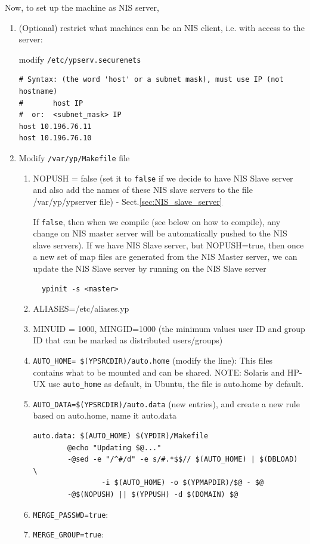 Now, to set up the machine as NIS server, 
\begin{enumerate}
   \item (Optional) restrict what machines can be an NIS client, i.e. with
   access to the server: 
   
modify \verb!/etc/ypserv.securenets!
{\tiny
\begin{verbatim}
# Syntax: (the word 'host' or a subnet mask), must use IP (not hostname) 
#       host IP
#  or:  <subnet_mask> IP
host 10.196.76.11
host 10.196.76.10
\end{verbatim}
}

   \item Modify \verb!/var/yp/Makefile! file 

\begin{enumerate}
  \item NOPUSH = false (set it to \verb!false! if we decide to have NIS Slave
  server and also add the names of these NIS slave servers to the file 
  /var/yp/ypserver file) - Sect.\ref{sec:NIS_slave_server}
  
  If \verb!false!, then when  we compile (see below on how to compile), any
  change on NIS master server will be automatically pushed to the NIS slave
  servers). If we have NIS Slave server, but NOPUSH=true, then once a new set of
  map files are generated from the NIS Master server, we can update the NIS
  Slave server by running on the NIS Slave server
  \begin{verbatim}
  ypinit -s <master>
  \end{verbatim}
  
  \item ALIASES=/etc/aliases.yp
  
  \item MINUID = 1000, MINGID=1000 (the minimum values user ID and group ID that
  can be marked as distributed users/groups)
  
  
  \item \verb!AUTO_HOME= $(YPSRCDIR)/auto.home! (modify the line): This files
  contains what to be mounted and can be shared. NOTE: Solaris and HP-UX use
  \verb!auto_home! as default, in Ubuntu, the file is auto.home by default. 
  
  \item \verb!AUTO_DATA=$(YPSRCDIR)/auto.data! (new entries), and create a new
  rule based on auto.home, name it auto.data
{\small 
\begin{verbatim}
auto.data: $(AUTO_HOME) $(YPDIR)/Makefile
        @echo "Updating $@..."
        -@sed -e "/^#/d" -e s/#.*$$// $(AUTO_HOME) | $(DBLOAD) \
                -i $(AUTO_HOME) -o $(YPMAPDIR)/$@ - $@
        -@$(NOPUSH) || $(YPPUSH) -d $(DOMAIN) $@
\end{verbatim}
}
  \item \verb!MERGE_PASSWD=true!: 
  \item \verb!MERGE_GROUP=true!:
  

\end{enumerate}
\end{enumerate}
